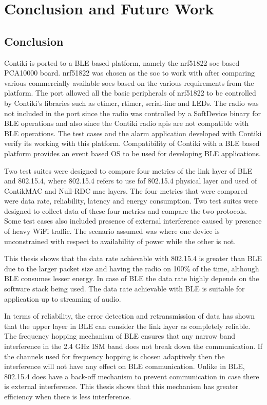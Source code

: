 \chapter{Conclusion and Future Work} \label{9ConcFuture}
\section{Conclusion}

Contiki is ported to a BLE based platform, namely the nrf51822 \gls{soc} based PCA10000 board. nrf51822 was chosen as the \gls{soc} to work with after comparing various commercially available \glspl{soc} based on the various requirements from the platform. The port allowed all the basic peripherals of nrf51822 to be controlled by Contiki's libraries such as etimer, rtimer, serial-line and LEDs.  The radio was not included in the port since the radio was controlled by a SoftDevice binary for BLE operations and also since the Contiki radio \glspl{api} are not compatible with BLE operations. The test cases and the alarm application developed with Contiki verify its working with this platform. Compatibility of Contiki with a BLE based platform provides an event based OS to be used for developing BLE applications.

Two test suites were designed to compare four metrics of the link layer of BLE and 802.15.4, where 802.15.4 refers to use fof 802.15.4 physical layer and used of ContikMAC and Null-RDC \gls{mac} layers. The four metrics that were compared were data rate, reliability, latency and energy consumption. Two test suites were designed to collect data of these four metrics and compare the two protocols. Some test cases also included presence of external interference caused by presence of heavy WiFi traffic. The scenario assumed was where one device is unconstrained with respect to availability of power while the other is not.

This thesis shows that the data rate achievable with 802.15.4 is greater than BLE due to the larger packet size and having the radio on 100\% of the time, although BLE consumes lesser energy. In case of BLE the data rate highly depends on the software stack being used. The data rate achievable with BLE is suitable for application up to streaming of audio.  

In terms of reliability, the error detection and retransmission of data has shown that the upper layer in BLE can consider the link layer as completely reliable. The frequency hopping mechanism of BLE ensures that any narrow band interference in the 2.4 GHz ISM band does not break down the communication. If the channels used for frequency hopping is chosen adaptively then the interference will not have any effect on BLE communication. Unlike in BLE, 802.15.4 does have a back-off mechanism to prevent communication in case there is external interference. This thesis shows that this mechanism has greater efficiency when there is less interference. 

